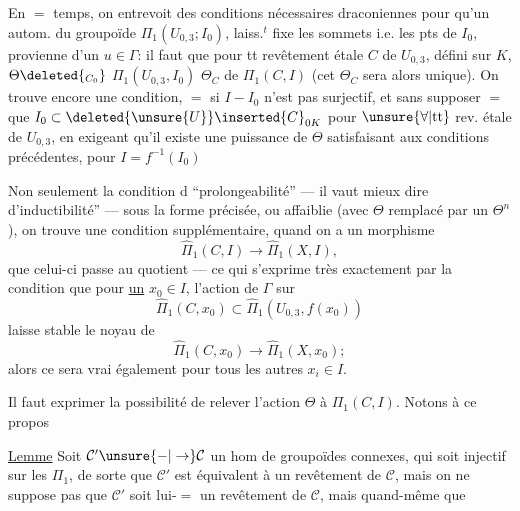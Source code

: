 En $=$ temps, on entrevoit des conditions nécessaires draconiennes pour qu'un autom. \inserted{$\Theta$} du groupoïde $\Pi_1(U_{0,3};I_0)$, laiss.$^t$ fixe les sommets i.e. les pts de $I_0$, provienne d'un $u\in\Gamma$: il faut que pour tt revêtement  étale $C$ de $U_{0,3}$, défini sur $K$,      $\Theta\deleted{_{C_0}}$  $\Pi_1(U_{0,3},I_0)$   $\Theta_C$ de $\Pi_1(C,I)$     (cet $\Theta_C$ sera alors unique). On trouve encore une condition, $=$ si $I-I_0$ n'est pas surjectif, et sans supposer $=$ que $I_0\subset \deleted{\unsure{U}}\inserted{C}_{0K}$ pour $\unsure{\forall|\mathrm{tt}}$ rev. étale de $U_{0,3}$, en exigeant qu'il existe une puissance  de $\Theta$  satisfaisant aux conditions précédentes, pour $I=f^{-1}(I_0)$ 

Non seulement la condition d  ``prolongeabilité'' --- il vaut mieux dire d'inductibilité'' --- sous la forme précisée, ou affaiblie (avec $\Theta$ remplacé par un $\Theta^n$), on trouve une condition supplémentaire, quand on a  un morphisme
\[
\widehat\Pi_1(C,I)\longrightarrow\widehat\Pi_1(X,I),
\]
que celui-ci passe au quotient --- ce qui s'exprime très exactement par la condition que pour \uline{un} $x_0\in I$, l'action de $\Gamma$ sur
\[
\widehat\Pi_1(C,x_0)\subset\widehat\Pi_1(U_{0,3},f(x_0))
\]
laisse stable le noyau de
\[
\widehat\Pi_1(C,x_0)\longrightarrow\widehat\Pi_1(X,x_0);
\]
alors ce sera vrai également pour tous les autres $x_i\in I$.

Il faut exprimer la possibilité de relever l'action  $\Theta$ à $\Pi_1(C,I)$. Notons à ce propos

\uline{Lemme} Soit $\mathcal C'\unsure{\mathbin{-}|\to}\mathcal C$ un hom de groupoïdes connexes, qui soit injectif sur les $\Pi_1$,  de sorte que $\mathcal C'$ est équivalent à un revêtement de $\mathcal C$, mais on ne suppose pas que $\mathcal C'$ soit lui-$=$ un revêtement de $\mathcal C$, mais quand-même que

